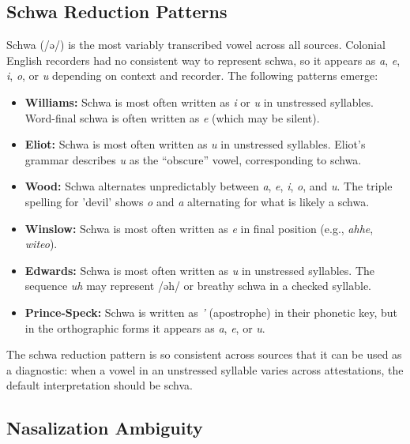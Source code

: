 \subsection{Schwa Reduction Patterns}

Schwa (/ə/) is the most variably transcribed vowel across all sources.
Colonial English recorders had no consistent way to represent schwa, so it
appears as \textit{a}, \textit{e}, \textit{i}, \textit{o}, or \textit{u}
depending on context and recorder. The following patterns emerge:

\begin{itemize}
  \item \textbf{Williams:} Schwa is most often written as \textit{i} or
    \textit{u} in unstressed syllables. Word-final schwa is often written as
    \textit{e} (which may be silent).

  \item \textbf{Eliot:} Schwa is most often written as \textit{u} in
    unstressed syllables. Eliot's grammar describes \textit{u} as the
    ``obscure'' vowel, corresponding to schwa.

  \item \textbf{Wood:} Schwa alternates unpredictably between \textit{a},
    \textit{e}, \textit{i}, \textit{o}, and \textit{u}. The triple spelling
    for 'devil' shows \textit{o} and \textit{a} alternating for what is
    likely a schwa.

  \item \textbf{Winslow:} Schwa is most often written as \textit{e} in final
    position (e.g., \textit{ahhe}, \textit{witeo}).

  \item \textbf{Edwards:} Schwa is most often written as \textit{u} in
    unstressed syllables. The sequence \textit{uh} may represent /əh/ or
    breathy schwa in a checked syllable.

  \item \textbf{Prince-Speck:} Schwa is written as \textit{'} (apostrophe)
    in their phonetic key, but in the orthographic forms it appears as
    \textit{a}, \textit{e}, or \textit{u}.
\end{itemize}

The schwa reduction pattern is so consistent across sources that it can be
used as a diagnostic: when a vowel in an unstressed syllable varies across
attestations, the default interpretation should be schva.

\subsection{Nasalization Ambiguity}


